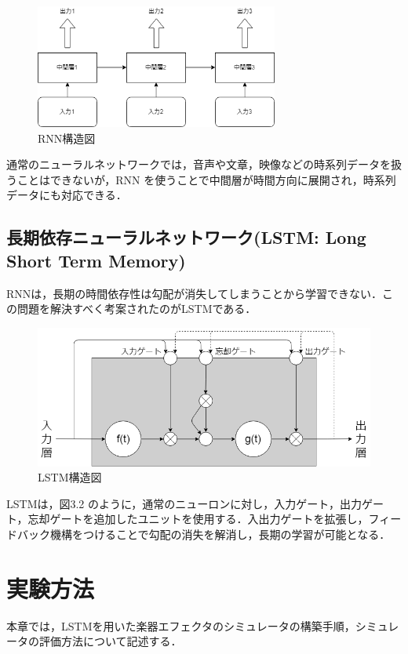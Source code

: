 \documentclass{jreport}		%
\begin{document}
\begin{figure}[htbp]
 \begin{center}
  \includegraphics[width=80mm]{RNN.png}
 \end{center}
 \caption{RNN構造図}
 \label{fig:one}
\end{figure}

通常のニューラルネットワークでは，音声や文章，映像などの時系列データを扱うことはできないが，RNN を使うことで中間層が時間方向に展開され，時系列データにも対応できる．

\section{長期依存ニューラルネットワーク(LSTM: Long Short Term Memory)}
RNNは，長期の時間依存性は勾配が消失してしまうことから学習できない．この問題を解決すべく考案されたのがLSTMである．
\newpage

\begin{figure}[htbp]
 \begin{center}
  \includegraphics[width=120mm]{LSTM.png}
 \end{center}
 \caption{LSTM構造図}
 \label{fig:one}
\end{figure}

LSTMは，図3.2 のように，通常のニューロンに対し，入力ゲート，出力ゲート，忘却ゲートを追加したユニットを使用する．入出力ゲートを拡張し，フィードバック機構をつけることで勾配の消失を解消し，長期の学習が可能となる．

\chapter{実験方法}
本章では，LSTMを用いた楽器エフェクタのシミュレータの構築手順，シミュレータの評価方法について記述する．
\end{document}
